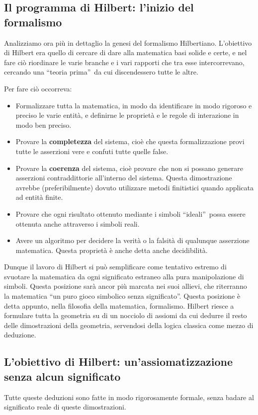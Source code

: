 \documentclass[a4paper,10pt]{article}
\begin{document}
\subsection[L'inizio del formalismo]{Il programma di Hilbert: l'inizio del formalismo}
Analizziamo ora più in dettaglio la genesi del formalismo Hilbertiano.
L'obiettivo di Hilbert era quello di cercare di dare alla matematica basi solide e certe, e nel fare ciò riordinare le varie branche e i vari rapporti che tra esse intercorrevano, cercando una \textquotedblleft teoria prima\textquotedblright\ da cui discendessero tutte le altre.

Per fare ciò occorreva:
\begin{itemize}
 \item Formalizzare tutta la matematica, in modo da identificare in modo rigoroso e preciso le varie entità, e definirne le proprietà e le regole di interazione in modo ben preciso.
 \item Provare la \textbf{completezza} del sistema, cioè che questa formalizzazione provi tutte le asserzioni vere e confuti tutte quelle false.
 \item Provare la \textbf{coerenza} del sistema, cioè provare che non si possano generare asserzioni contraddittorie all'interno del sistema. Questa dimostrazione avrebbe (preferibilmente) dovuto utilizzare metodi finitistici quando applicata ad entità finite.
 \item Provare che ogni risultato ottenuto mediante i simboli \textquotedblleft ideali\textquotedblright\ possa essere ottenuta anche attraverso i simboli reali.
 \item Avere un algoritmo per decidere la verità o la falsità di qualunque asserzione matematica. Questa proprietà è anche detta anche decidibilità.
\end{itemize}

Dunque il lavoro di Hilbert si può semplificare come tentativo estremo di svuotare la matematica da ogni significato estraneo alla pura manipolazione di simboli. Questa posizione sarà ancor più marcata nei suoi allievi, che riterranno la matematica “un puro gioco simbolico senza significato”.
Questa posizione è detta appunto, nella filosofia della matematica, formalismo.
Hilbert riesce a formulare tutta la geometria su di un nocciolo di assiomi da cui dedurre il resto delle dimostrazioni della geometria, servendosi della logica classica come mezzo di deduzione.

\subsection{L'obiettivo di Hilbert: un'assiomatizzazione senza alcun significato}
Tutte queste deduzioni sono fatte in modo rigorosamente formale, senza badare al significato reale di queste dimostrazioni.
\end{document}
